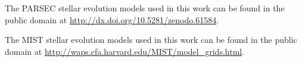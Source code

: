 \documentclass[fleqn,usenatbib]{rasti}
\begin{document}
The PARSEC stellar evolution models used in this work can be found in the public domain at \url{http://dx.doi.org/10.5281/zenodo.61584}.

The MIST stellar evolution models used in this work can be found in the public domain at \url{http://waps.cfa.harvard.edu/MIST/model_grids.html}.













\bsp	%
\label{lastpage}
\end{document}
